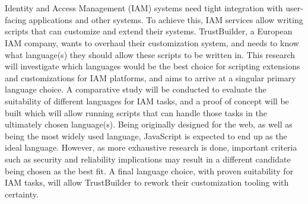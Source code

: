 \documentclass[english,dit,thesis]{hogentreport}
\begin{document}











\appendix

\chapter{}

\section*{}

Identity and Access Management (IAM) systems need tight integration with user-facing applications and other systems. To achieve this, IAM services allow writing scripts that can customize and extend their systems. TrustBuilder, a European IAM company, wants to overhaul their customization system, and needs to know what language(s) they should allow these scripts to be written in. This research will investigate which languages would be the best choice for scripting extensions and customizations for IAM platforms, and aims to arrive at a singular primary language choice. A comparative study will be conducted to evaluate the suitability of different languages for IAM tasks, and a proof of concept will be built which will allow running scripts that can handle those tasks in the ultimately chosen language(s). Being originally designed for the web, as well as being the most widely used language, JavaScript is expected to end up as the ideal language. However, as more exhaustive research is done, important criteria such as security and reliability implications may result in a different candidate being chosen as the best fit. A final language choice, with proven suitability for IAM tasks, will allow TrustBuilder to rework their customization tooling with certainty.
\end{document}
